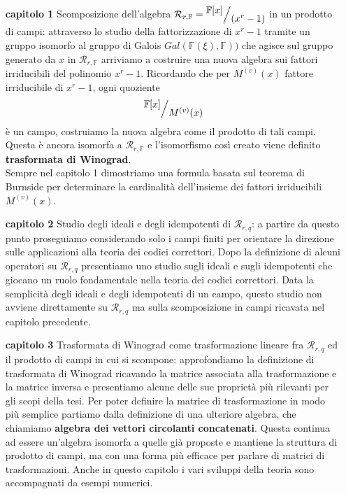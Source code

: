\begin{enumerate}
   \item[{\bf capitolo 1}] Scomposizione dell'algebra $\mathcal{R}_{r,\mathbb{F}} = \quotient{ \mathbb{F}[x] }{ (x^r -1 )} $ in un prodotto di campi: attraverso lo studio della fattorizzazione di $x^r -1$ tramite un gruppo isomorfo al gruppo di Galois $Gal(\mathbb{F}(\xi), \mathbb{F}))$ che agisce sul gruppo generato da $x$ in $\mathcal{R}_{r,\mathbb{F}} $ arriviamo a costruire una nuova algebra sui fattori irriducibili del polinomio $x^r -1$. Ricordando che per $M^{(v)}(x)$ fattore irriducibile di $x^r -1$, ogni quoziente
   \begin{align*}
      \quotient{ \mathbb{F}[x] }{ M^{(v)}(x) }
   \end{align*}
   è un campo, costruiamo la nuova algebra come il prodotto di tali campi. Questa è ancora isomorfa a $\mathcal{R}_{r,\mathbb{F}}$ e l'isomorfismo così creato viene definito {\bf trasformata di Winograd}.\\
   Sempre nel capitolo 1 dimostriamo una formula basata sul teorema di Burnside per determinare la cardinalità dell'insieme dei fattori irriducibili $M^{(v)}(x)$.

   \item[{\bf capitolo 2}] Studio degli ideali e degli idempotenti di $\mathcal{R}_{r,q}$: a partire da questo punto proseguiamo considerando solo i campi finiti per orientare la direzione sulle applicazioni alla teoria dei codici correttori. Dopo la definizione di alcuni operatori su $\mathcal{R}_{r,q}$ presentiamo uno studio sugli ideali e sugli idempotenti che giocano un ruolo fondamentale nella teoria dei codici correttori. Data la semplicità degli ideali e degli idempotenti di un campo, questo studio non avviene direttamente su $\mathcal{R}_{r,q}$ ma sulla scomposizione in campi ricavata nel capitolo precedente.

   \item[{\bf capitolo 3}] Trasformata di Winograd come trasformazione lineare fra $\mathcal{R}_{r,q}$ ed il prodotto di campi in cui si scompone: approfondiamo la definizione di trasformata di Winograd ricavando la matrice associata alla trasformazione e la matrice inversa e presentiamo alcune delle sue proprietà più rilevanti per gli scopi della tesi. Per poter definire la matrice di trasformazione in modo più semplice partiamo dalla definizione di una ulteriore algebra, che chiamiamo {\bf algebra dei vettori circolanti concatenati}. Questa continua ad essere un'algebra isomorfa a quelle già proposte e mantiene la struttura di prodotto di campi, ma con una forma più efficace per parlare di matrici di trasformazioni. Anche in questo capitolo i vari sviluppi della teoria sono accompagnati da esempi numerici.


\end{enumerate}
